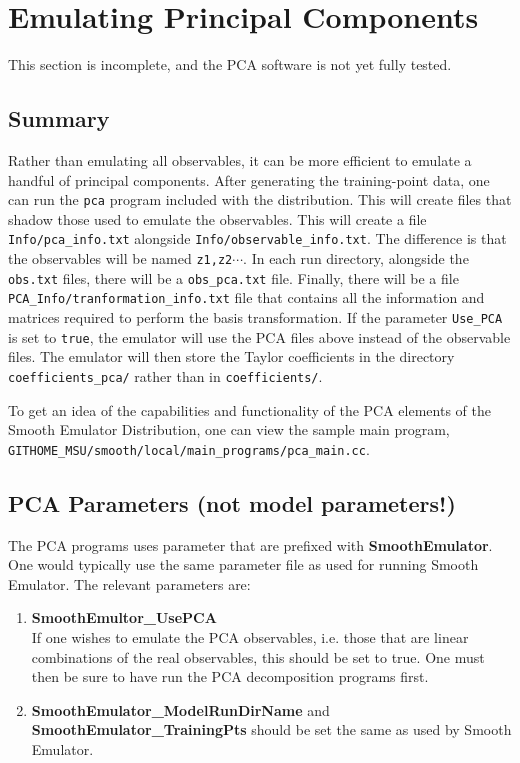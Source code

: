 \documentclass[main.tex]{subfiles}
\begin{document}
\setcounter{section}{5}
\section{Emulating Principal Components}\label{sec:pca}

This section is incomplete, and the PCA software is not yet fully tested. 

\subsection{Summary}

Rather than emulating all observables, it can be more efficient to emulate a handful of principal components. After generating the training-point data, one can run the {\tt pca} program included with the distribution. This will create files that shadow those used to emulate the observables. This will create a file {\tt Info/pca\_info.txt} alongside {\tt Info/observable\_info.txt}. The difference is that the observables will be named {\tt z1,z2}$\cdots$. In each run directory, alongside the {\tt obs.txt} files, there will be a {\tt obs\_pca.txt} file. Finally, there will be a file {\tt PCA\_Info/tranformation\_info.txt} file that contains all the information and matrices required to perform the basis transformation. If the parameter {\tt Use\_PCA} is set to {\tt true}, the emulator will use the PCA files above instead of the observable files. The emulator will then store the Taylor coefficients in the directory {\tt coefficients\_pca/} rather than in {\tt coefficients/}. 

To get an idea of the capabilities and functionality of the PCA elements of the Smooth Emulator Distribution, one can view the sample main program,\\
{\tt GITHOME\_MSU/smooth/local/main\_programs/pca\_main.cc}. 

\subsection{PCA Parameters (not model parameters!)}
The PCA programs uses parameter that are prefixed with {\bf SmoothEmulator}. One would typically use the same parameter file as used for running Smooth Emulator. The relevant parameters are:
\begin{enumerate}\itemsep=0pt
\item {\bf SmoothEmultor\_UsePCA}\\
If one wishes to emulate the PCA observables, i.e. those that are linear combinations of the real observables, this should be set to true. One must then be sure to have run the PCA decomposition programs first. 
\item {\bf SmoothEmulator\_ModelRunDirName} and {\bf SmoothEmulator\_TrainingPts} should be set the same as used by Smooth Emulator.
\end{enumerate}
\end{document}
